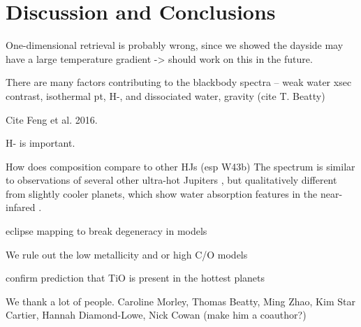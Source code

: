 \documentclass[twocolumn]{aastex61}
\begin{document}
\section{Discussion and Conclusions}
\label{sec:discussion}
One-dimensional retrieval is probably wrong, since we showed the dayside may have a large temperature gradient -> should work on this in the future.


There are many factors contributing to the blackbody spectra --
weak water xsec contrast, isothermal pt, H-, and dissociated water, gravity (cite T. Beatty)

Cite Feng et al. 2016.

H- is important.

How does composition compare to other HJs (esp W43b)
The spectrum is similar to observations of several other ultra-hot Jupiters \citep[][]{arcangeli18, mansfield18}, but qualitatively different from slightly cooler planets, which show water absorption features in the near-infared \citep[e.g.][]{kreidberg14b, line16}.  

eclipse mapping to break degeneracy in models

We rule out the low metallicity and or high C/O models

confirm prediction that TiO is present in the hottest planets

\acknowledgments
We thank a lot of people. Caroline Morley, Thomas Beatty, Ming Zhao, Kim Star Cartier, Hannah Diamond-Lowe, Nick Cowan (make him a coauthor?)



\end{document}
